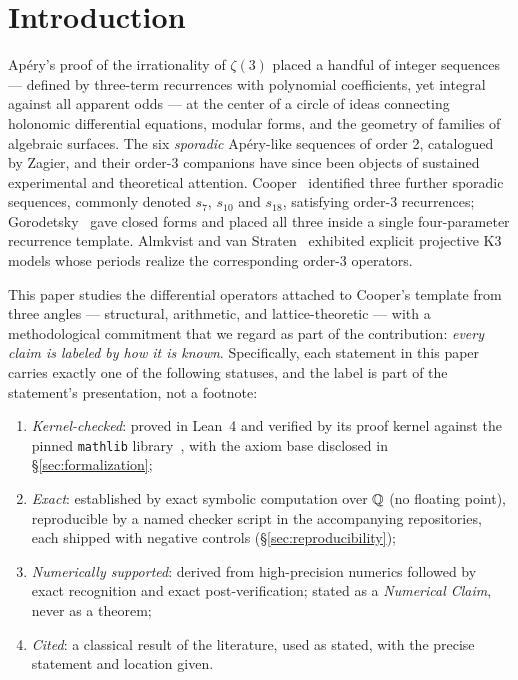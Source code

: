 \section{Introduction}\label{sec:intro}

Ap\'ery's proof of the irrationality of $\zeta(3)$ placed a handful of integer
sequences --- defined by three-term recurrences with polynomial coefficients,
yet integral against all apparent odds --- at the center of a circle of ideas
connecting holonomic differential equations, modular forms, and the geometry
of families of algebraic surfaces. The six \emph{sporadic} Ap\'ery-like
sequences of order 2, catalogued by Zagier, and their order-3 companions have
since been objects of sustained experimental and theoretical attention.
Cooper~\cite{Cooper2012} identified three further sporadic sequences, commonly
denoted $s_7$, $s_{10}$ and $s_{18}$, satisfying order-3 recurrences;
Gorodetsky~\cite{Gorodetsky2023} gave closed forms and placed all three inside
a single four-parameter recurrence template. Almkvist and van
Straten~\cite{AlmkvistvanStraten2021} exhibited explicit projective K3 models
whose periods realize the corresponding order-3 operators.

This paper studies the differential operators attached to Cooper's template
from three angles --- structural, arithmetic, and lattice-theoretic --- with a
methodological commitment that we regard as part of the contribution:
\emph{every claim is labeled by how it is known}. Specifically, each statement
in this paper carries exactly one of the following statuses, and the label is
part of the statement's presentation, not a footnote:

\begin{enumerate}
\item[\textbf{(K)}] \emph{Kernel-checked}: proved in Lean~4 and verified by
  its proof kernel against the pinned \texttt{mathlib}
  library~\cite{deMouraUllrich2021,mathlibCPP2020,mathlib4}, with the axiom
  base disclosed in \S\ref{sec:formalization};
\item[\textbf{(E)}] \emph{Exact}: established by exact symbolic computation
  over $\mathbb{Q}$ (no floating point), reproducible by a named checker script in the
  accompanying repositories, each shipped with negative controls
  (\S\ref{sec:reproducibility});
\item[\textbf{(N)}] \emph{Numerically supported}: derived from
  high-precision numerics followed by exact recognition and exact
  post-verification; stated as a \emph{Numerical Claim}, never as a theorem;
\item[\textbf{(C)}] \emph{Cited}: a classical result of the literature, used
  as stated, with the precise statement and location given.
\end{enumerate}

